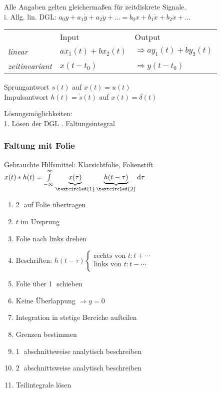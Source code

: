 \documentclass[german]{latex4ei/latex4ei_sheet}
\renewcommand{\diff}{\mathop{}\!\mathrm{\vphantom( d}}
\begin{document}
	\begin{sectionbox}
	Alle Angaben gelten gleichermaßen für zeitdiskrete Signale.\\
	i. Allg. lin. DGL: $a_0 y + a_1 \dot{y} + a_2 \ddot{y} + \dots = b_0 x + b_1 \dot{x} + b_2 \ddot{x} + \dots$
	\begin{tabular}{@{}lll}
		& Input & Output\\
		\emph{linear} & $a x_1(t) + b x_2(t)$ & $\Rightarrow a y_1(t) + b y_2(t)$\\
		\emph{zeitinvariant} & $x(t-t_0)$ & $\Rightarrow y(t-t_0)$\\
	\end{tabular}
	
	Sprungantwort $s(t)$ auf $x(t) = u(t)$\\
	Impulsantwort $h(t) = \dot s(t)$ auf $x(t) = \delta(t)$
	
	Lösungsmöglichkeiten:\\
	1. Lösen der DGL . Faltungsintegral\\
	
	\subsubsection*{Faltung mit Folie}
	Gebrauchte Hilfsmittel: Klarsichtfolie, Folienstift\\
	$x(t) \ast h(t) = \int\limits_{-\infty}^{\infty}{\underbrace{x(\tau)}_{\textcircled{1}} \underbrace{h(t - \tau)}_{\textcircled{2}} \diff \tau}$
	\begin{enumerate}
		\item \textcircled{2} auf Folie übertragen
		\item $t$ im Ursprung
		\item Folie nach links drehen
		\item Beschriften: $h(t - \tau) \begin{cases}
			\text{rechts von }t: t + \cdots\\
			\text{links von }t: t - \cdots\\
		\end{cases}$
		\item Folie über \textcircled{1} schieben
		\item Keine Überlappung $\Rightarrow y = 0$
		\item Integration in stetige Bereiche aufteilen
		\item Grenzen bestimmen
		\item \textcircled{1} abschnittsweise analytisch beschreiben
		\item \textcircled{2} abschnittsweise analytisch beschreiben
		\item Teilintegrale lösen
	\end{enumerate}
	\end{sectionbox}
\end{document}

